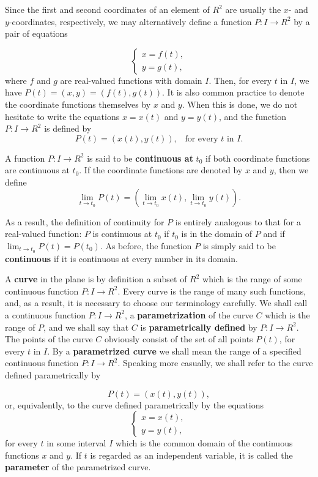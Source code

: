 Since the first and second coordinates of an element of $R^2$ are usually the $x$- and $y$-coordinates, respectively, we may alternatively define a function
$P : I \rightarrow R^2$ by a pair of equations 

$$
\left \{ \begin{array}{l}
x = f(t), \\
y = g(t),

\end{array}
\right .
$$
\noindent where $f$ and $g$ are real-valued functions with domain $I$. Then, for every $t$ in $I$, we have $P(t) = (x, y) = (f(t), g(t))$. It is also common practice to denote the coordinate functions themselves by $x$ and $y$. When this is done, we do not hesitate to write the equations $x = x(t)$ and $y = y(t)$, and the function $P : I \rightarrow R^2$ is defined by
$$
P(t) = (x(t), y(t)), \;\;\;\mbox{for every $t$ in $I$.}
$$

A function $P : I \rightarrow R^2$ is said to be \textbf{continuous at} $t_0$ if both coordinate functions are continuous at $t_0$. If the coordinate functions are denoted by $x$ and $y$, then we define
$$
\lim_{t \rightarrow t_0} P(t) = (\lim_{t \rightarrow t_0} x(t), \lim_{t \rightarrow t_0} y(t)).
$$

\noindent As a result, the definition of continuity for $P$ is entirely analogous to that for a real-valued function: $P$ is continuous at $t_0$ if $t_0$ is in the domain of $P$ and if $\lim_{t \rightarrow t_0} P(t) = P(t_0)$. As before, the function $P$ is simply said to be \textbf{continuous} if it is continuous at every number in its domain.

A \textbf{curve} in the plane is by definition a subset of $R^2$ which is the range of some continuous function $P : I \rightarrow R^2$. Every curve is the range of many such functions, and, as a result, it is necessary to choose our terminology carefully. We shall call a continuous function $P : I \rightarrow R^2$, a \textbf{parametrization} of the curve $C$ which is the range of $P$, and we shall say that $C$ is \textbf{parametrically defined} by $P : I \rightarrow R^2$. The points of the curve $C$ obviously consist of the set of all points $P(t)$, for every $t$ in $I$. By a \textbf{parametrized curve} we shall mean the range of a specified continuous function $P : I \rightarrow R^2$. Speaking more casually, we shall refer to the curve defined parametrically by

$$
P(t)= (x(t), y(t)), 
$$
\noindent or, equivalently, to the curve defined parametrically by the equations 
$$
\left \{ \begin{array}{l}
x = x(t), \\
y = y(t),
\end{array}
\right .
$$
\noindent for every $t$ in some interval $I$ which is the common domain of the continuous functions $x$ and $y$. If $t$ is regarded as an independent variable, it is called the \textbf{parameter} of the parametrized curve.

